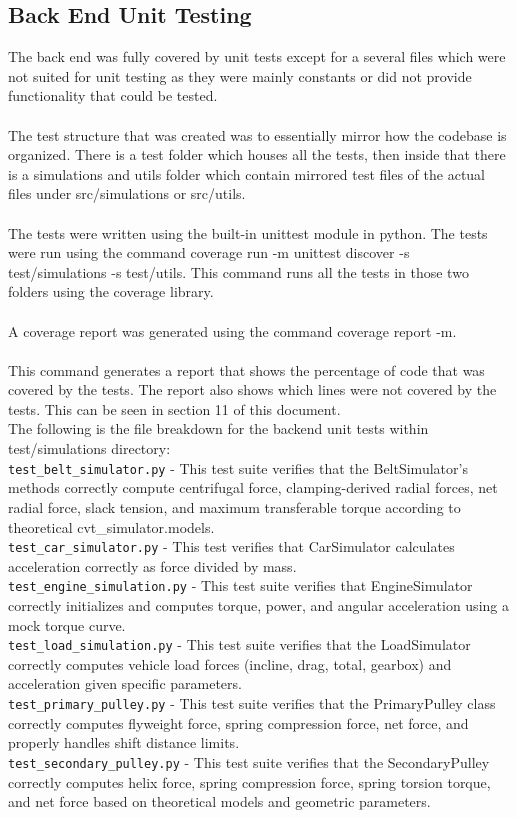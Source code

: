 \documentclass[12pt, titlepage]{article}
\begin{document}
\subsection{Back End Unit Testing}
The back end was fully covered by unit tests except for a several files which were not suited for unit testing as they were mainly constants or did not provide functionality that could be tested. \\
\\
The test structure that was created was to essentially mirror how the codebase is organized. There is a test folder which houses all the tests, then inside that there is a simulations and utils folder which contain mirrored test files of the actual files under src/simulations or src/utils.\\
\\
The tests were written using the built-in unittest module in python. The tests were run using the command coverage run -m unittest discover -s test/simulations -s test/utils. This command runs all the tests in those two folders using the coverage library.\\
\\
A coverage report was generated using the command coverage report -m.\\
\\
This command generates a report that shows the percentage of code that was covered by the tests. The report also shows which lines were not covered by the tests.
This can be seen in section 11 of this document.\\

\noindent The following is the file breakdown for the backend unit tests within test/simulations directory:
\\
\texttt{test\_belt\_simulator.py} - This test suite verifies that the BeltSimulator’s methods correctly compute centrifugal force, clamping-derived radial forces, net radial force, slack tension, and maximum transferable torque according to theoretical cvt_simulator.models.
\\
\texttt{test\_car\_simulator.py} - This test verifies that CarSimulator calculates acceleration correctly as force divided by mass.
\\
\texttt{test\_engine\_simulation.py} - This test suite verifies that EngineSimulator correctly initializes and computes torque, power, and angular acceleration using a mock torque curve.
\\
\texttt{test\_load\_simulation.py} - This test suite verifies that the LoadSimulator correctly computes vehicle load forces (incline, drag, total, gearbox) and acceleration given specific parameters.
\\
\texttt{test\_primary\_pulley.py} - This test suite verifies that the PrimaryPulley class correctly computes flyweight force, spring compression force, net force, and properly handles shift distance limits.
\\
\texttt{test\_secondary\_pulley.py} - This test suite verifies that the SecondaryPulley correctly computes helix force, spring compression force, spring torsion torque, and net force based on theoretical models and geometric parameters. 
\\
\end{document}
